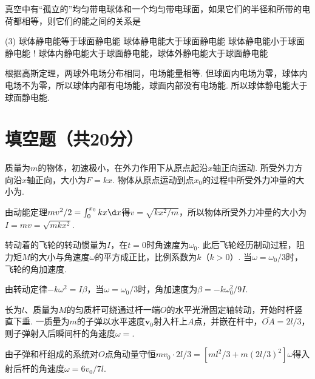 \begin{problem}
    真空中有``孤立的''均匀带电球体和一个均匀带电球面，如果它们的半径和所带的电荷都相等，则它们的能之间的关系是
    \begin{tasks}(3)
        \task 球体静电能等于球面静电能
        \task[\true] 球体静电能大于球面静电能
        \task 球体静电能小于球面静电能
        \task! 球体内静电能大于球面静电能，球体外静电能大于球面静电能
    \end{tasks}
\end{problem}
\begin{solution}
    根据高斯定理，两球外电场分布相同，电场能量相等. 但球面内电场为零，球体内电场不为零，所以球体内部有电场能，球面内部没有电场能. 所以球体静电能大于球面静电能.
\end{solution}

\section{填空题（共20分）}

\begin{problem}
    质量为$m$的物体，初速极小，在外力作用下从原点起沿$x$轴正向运动. 所受外力方向沿$x$轴正向，大小为$F=kx$. 物体从原点运动到点$x_0$的过程中所受外力冲量的大小为.
\end{problem}
\begin{solution}
    由动能定理$mv^2/2=\int_0^{x_0}kx\d x$得$v=\sqrt{kx^2/m}$，所以物体所受外力冲量的大小为$I=mv=\sqrt{mkx^2}$.
\end{solution}

\begin{problem}
    转动着的飞轮的转动惯量为$I$，在$t=0$时角速度为$\omega_0$. 此后飞轮经历制动过程，阻力矩$M$的大小与角速度$\omega$的平方成正比，比例系数为$k$（$k>0$）. 当$\omega=\omega_0/3$时，飞轮的角加速度.
\end{problem}
\begin{solution}
    由转动定律$-k\omega^2=I\beta$，当$\omega=\omega_0/3$时，角加速度为$\beta=-k\omega_0^2/9I$.
\end{solution}

\begin{problem}
    长为$l$、质量为$M$的匀质杆可绕通过杆一端$O$的水平光滑固定轴转动，开始时杆竖直下垂. 一质量为$m$的子弹以水平速度$\bm v_0$射入杆上$A$点，并嵌在杆中，$\overline{OA}=2l/3$，则子弹射入后瞬间杆的角速度$\omega=$.
\end{problem}
\begin{solution}
    由子弹和杆组成的系统对$O$点角动量守恒$mv_0\cdot2l/3=[ml^2/3+m(2l/3)^2]\omega$得入射后杆的角速度$\omega=6v_0/7l$.
\end{solution}

